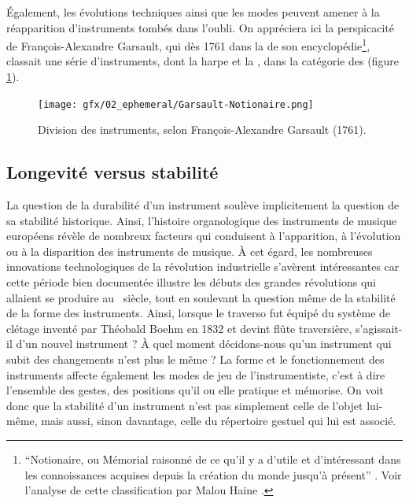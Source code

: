 \indent Également, les évolutions techniques ainsi que les modes peuvent amener à la réapparition d'instruments tombés dans l'oubli. On appréciera ici la perspicacité de François-Alexandre Garsault, qui dès 1761 dans la  de son encyclopédie\footnote{``Notionaire, ou Mémorial raisonné de ce qu'il y a d'utile et d'intéressant dans les connoissances acquises depuis la création du monde jusqu'à présent'' \cite{de_garsault_notionaire_1761}. Voir l'analyse de cette classification par Malou Haine \cite{haine_les_2018}.}, classait une série d'instruments, dont la harpe et la , dans la catégorie des (figure \ref{fig:ephemeral:Garsault}).

\begin{figure}[!htbp]
	\captionsetup{format=plain}%
	\texttt{[image: gfx/02\_ephemeral/Garsault-Notionaire.png]}
	\caption[Division des instruments, selon Garsault (1761)]{Division des instruments, selon François-Alexandre Garsault (1761).}
	\label{fig:ephemeral:Garsault}
\end{figure}

\subsection{Longevité versus stabilité}
\label{sec:ephemeral:longevity_stability}

\noindent La question de la durabilité d'un instrument soulève implicitement la question de sa stabilité historique. Ainsi, l'histoire organologique des instruments de musique européens révèle de nombreux facteurs qui conduisent à l'apparition, à l'évolution ou à la disparition des instruments de musique. À cet égard, les nombreuses innovations technologiques de la révolution industrielle s'avèrent intéressantes car cette période bien documentée illustre les débuts des grandes révolutions qui allaient se produire au ~siècle, tout en soulevant la question même de la stabilité de la forme des instruments. Ainsi, lorsque le traverso fut équipé du système de clétage inventé par Théobald Boehm en 1832 et devint flûte traversière, s'agissait-il d'un nouvel instrument ? À quel moment décidons-nous qu'un instrument qui subit des changements n'est plus le même ? La forme et le fonctionnement des instruments affecte également les modes de jeu de l'instrumentiste, c'est à dire l'ensemble des gestes, des positions qu'il ou elle pratique et mémorise. On voit donc que la stabilité d'un instrument n'est pas simplement celle de l'objet lui-même, mais aussi, sinon davantage, celle du répertoire gestuel qui lui est associé.

